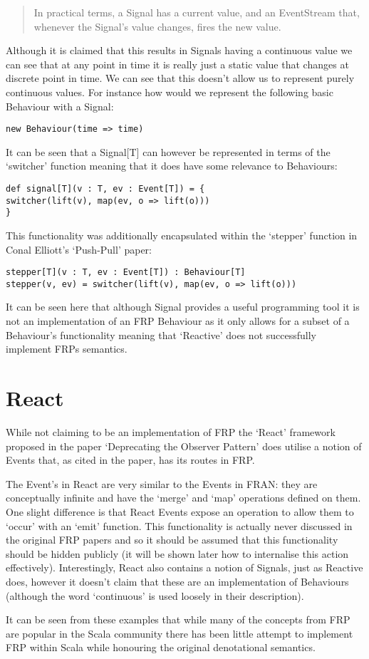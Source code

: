       \begin{quote}
        In practical terms, a Signal has a current value, and an EventStream that, whenever the Signal's value changes,     
        fires the new value.
      \end{quote}  
      
      Although it is claimed that this results in Signals having a continuous value we can see
      that at any point in time it is really just a static value that changes at discrete point in
      time. We can see that this doesn't allow us to represent purely continuous values. For instance
      how would we represent the following basic Behaviour with a Signal:
      
\begin{verbatim}
new Behaviour(time => time)
\end{verbatim}

      It can be seen that a Signal[T] can however be represented in terms
      of the `switcher' function meaning that it does have some relevance to Behaviours:
      
\begin{verbatim}
def signal[T](v : T, ev : Event[T]) = {
switcher(lift(v), map(ev, o => lift(o)))
}
\end{verbatim}  

      This functionality was additionally encapsulated within the `stepper' function in Conal Elliott's
      `Push-Pull' paper:

\begin{verbatim}
stepper[T](v : T, ev : Event[T]) : Behaviour[T]
stepper(v, ev) = switcher(lift(v), map(ev, o => lift(o)))
\end{verbatim} 

      It can be seen here that although Signal provides a useful programming tool it is not an implementation
      of an FRP Behaviour as it only allows for a subset of a Behaviour's functionality meaning that `Reactive'
      does not successfully implement FRPs semantics.
    
    \section{React}
      While not claiming to be an implementation of FRP the `React' framework proposed in the 
      paper `Deprecating the Observer Pattern' does utilise a notion of Events that, as cited in the paper,
      has its routes in FRP.
      
      The Event's in React are very similar to the Events in FRAN: they are conceptually infinite
      and have the `merge' and `map' operations defined on them. One slight difference is that React
      Events expose an operation to allow them to `occur' with an `emit' function. This functionality
      is actually never discussed in the original FRP papers and so it should be assumed that this
      functionality should be hidden publicly (it will be shown later how to internalise this action
      effectively). Interestingly, React also contains a notion of Signals, just as Reactive does, however
      it doesn't claim that these are an implementation of Behaviours (although the word `continuous' is
      used loosely in their description). 
      
  It can be seen from these examples that while many of the concepts from FRP are popular
  in the Scala community there has been little attempt to implement FRP within Scala while honouring
  the original denotational semantics.